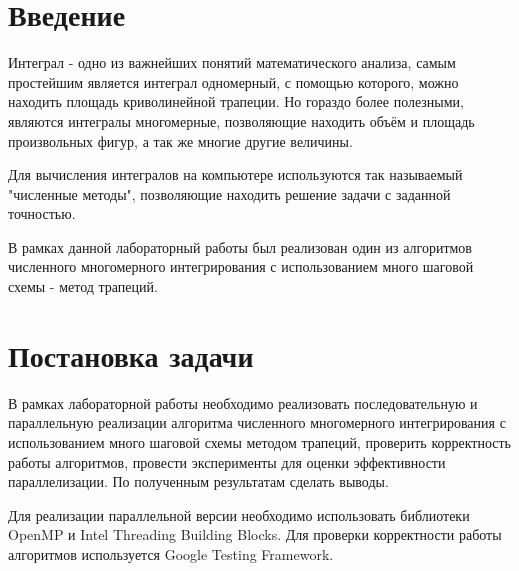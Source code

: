 \documentclass{report}
\begin{document}
\setcounter{page}{2}

\tableofcontents
\newpage

\section*{Введение}
Интеграл - одно из важнейших понятий математического анализа, самым простейшим является интеграл одномерный, с помощью которого, можно находить площадь криволинейной трапеции. Но гораздо более полезными, являются интегралы многомерные, позволяющие находить объём и площадь произвольных фигур, а так же многие другие величины.
\par Для вычисления интегралов на компьютере используются так называемый "численные методы", позволяющие находить решение задачи с заданной точностью.
\par В рамках данной лабораторный работы был реализован один из алгоритмов численного многомерного интегрирования с использованием много шаговой схемы - метод трапеций.

\newpage

\section*{Постановка задачи}
В рамках лабораторной работы необходимо реализовать последовательную и параллельную реализации алгоритма численного многомерного интегрирования с использованием много шаговой схемы методом трапеций, проверить корректность работы алгоритмов, провести эксперименты для оценки эффективности параллелизации. По полученным результатам сделать выводы.
\par Для реализации параллельной версии необходимо использовать библиотеки OpenMP и Intel Threading Building Blocks. Для проверки корректности работы алгоритмов используется Google Testing Framework.
\newpage

\end{document}
